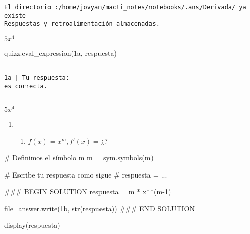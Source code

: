\documentclass[
  letterpaper,
  DIV=11,
  numbers=noendperiod]{scrreprt}
\newenvironment{Shaded}{\begin{snugshade}}{\end{snugshade}}
\newcommand{\BuiltInTok}[1]{\textcolor[rgb]{0.00,0.23,0.31}{#1}}
\newcommand{\CommentTok}[1]{\textcolor[rgb]{0.37,0.37,0.37}{#1}}
\newcommand{\DecValTok}[1]{\textcolor[rgb]{0.68,0.00,0.00}{#1}}
\newcommand{\NormalTok}[1]{\textcolor[rgb]{0.00,0.23,0.31}{#1}}
\newcommand{\OperatorTok}[1]{\textcolor[rgb]{0.37,0.37,0.37}{#1}}
\newcommand{\RegionMarkerTok}[1]{\textcolor[rgb]{0.00,0.23,0.31}{#1}}
\newcommand{\StringTok}[1]{\textcolor[rgb]{0.13,0.47,0.30}{#1}}
\providecommand{\tightlist}{%
  \setlength{\itemsep}{0pt}\setlength{\parskip}{0pt}}\usepackage{longtable,booktabs,array}
\begin{document}
\begin{verbatim}
El directorio :/home/jovyan/macti_notes/notebooks/.ans/Derivada/ ya existe
Respuestas y retroalimentación almacenadas.
\end{verbatim}

$\displaystyle 5 x^{4}$

\begin{Shaded}
\begin{Highlighting}[]
\NormalTok{quizz.eval\_expression(}\StringTok{\textquotesingle{}1a\textquotesingle{}}\NormalTok{, respuesta)}
\end{Highlighting}
\end{Shaded}

\begin{verbatim}
----------------------------------------
1a | Tu respuesta:
es correcta.
----------------------------------------
\end{verbatim}

$\displaystyle 5 x^{4}$

\begin{enumerate}
\def\labelenumi{\arabic{enumi}.}
\tightlist
\item
  \begin{enumerate}
  \def\labelenumii{\alph{enumii}.}
  \setcounter{enumii}{1}
  \tightlist
  \item
    \(f(x) = x^m, f'(x)= ¿?\)
  \end{enumerate}
\end{enumerate}

\begin{Shaded}
\begin{Highlighting}[]
\CommentTok{\# Definimos el símbolo m}
\NormalTok{m }\OperatorTok{=}\NormalTok{ sym.symbols(}\StringTok{\textquotesingle{}m\textquotesingle{}}\NormalTok{)}

\CommentTok{\# Escribe tu respuesta como sigue }
\CommentTok{\# respuesta = ...}

\CommentTok{\#\#\# }\RegionMarkerTok{BEGIN}\CommentTok{ SOLUTION}
\NormalTok{respuesta }\OperatorTok{=}\NormalTok{ m }\OperatorTok{*}\NormalTok{ x}\OperatorTok{**}\NormalTok{(m}\OperatorTok{{-}}\DecValTok{1}\NormalTok{)}

\NormalTok{file\_answer.write(}\StringTok{\textquotesingle{}1b\textquotesingle{}}\NormalTok{, }\BuiltInTok{str}\NormalTok{(respuesta))}
\CommentTok{\#\#\# }\RegionMarkerTok{END}\CommentTok{ SOLUTION}

\NormalTok{display(respuesta)}
\end{Highlighting}
\end{Shaded}
\end{document}
